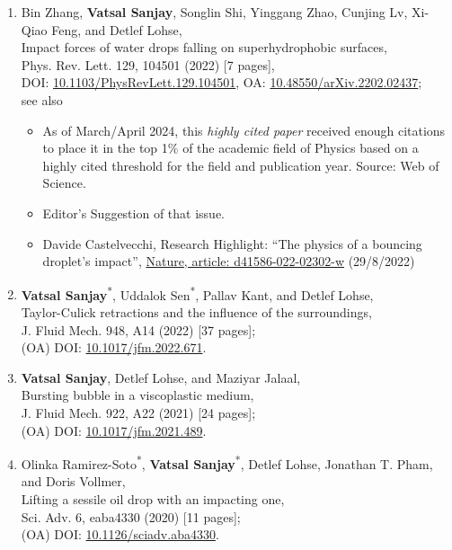 \documentclass[11pt,a4paper,roman,english,colorlinks,linkcolor={red!50!black}]{moderncv}
\newcommand{\equalcontrib}[1]{\textsuperscript{#1}}
\begin{document}
\begin{enumerate}[leftmargin=0.75cm]
	\item Bin Zhang, \textbf{Vatsal Sanjay}, Songlin Shi,  Yinggang Zhao,  Cunjing Lv,  Xi-Qiao Feng,  and Detlef Lohse,\\
	Impact forces of water drops falling on superhydrophobic surfaces,\\
	Phys. Rev. Lett. 129, 104501 (2022) [7 pages],\\
	DOI: \href{https://doi.org/10.1103/PhysRevLett.129.104501}{10.1103/PhysRevLett.129.104501}, OA:  \href{https://doi.org/10.48550/arXiv.2202.02437}{10.48550/arXiv.2202.02437};\\
	see also
	\begin{itemize}
		\item
		As of March/April 2024, this \textit{highly cited paper} received enough citations to place it in the top 1\% of the academic field of Physics based on a highly cited threshold for the field and publication year. Source: Web of Science.
		\item
		Editor's Suggestion of that issue.
		\item
		Davide Castelvecchi, Research Highlight: ``The physics of a bouncing droplet's impact'', \href{https://www.nature.com/articles/d41586-022-02302-w}{Nature, article: d41586-022-02302-w} (29/8/2022)
	\end{itemize}

	\item \textbf{Vatsal Sanjay}\equalcontrib{*}, Uddalok Sen\equalcontrib{*}, Pallav Kant, and Detlef Lohse,\\
	Taylor-Culick retractions and the influence of the surroundings,\\
	J. Fluid Mech. 948, A14  (2022) [37 pages];\\
	(OA) DOI: \href{https://doi.org/10.1017/jfm.2022.671}{10.1017/jfm.2022.671}.

	\item \textbf{Vatsal Sanjay}, Detlef Lohse, and Maziyar Jalaal,\\
	Bursting bubble in a viscoplastic medium,\\
	J. Fluid Mech. 922, A22  (2021) [24 pages];\\
	(OA) DOI: \href{https://doi.org/10.1017/jfm.2021.489}{10.1017/jfm.2021.489}.

	\item Olinka Ramirez-Soto\equalcontrib{*}, \textbf{Vatsal Sanjay}\equalcontrib{*},  Detlef Lohse,  Jonathan T. Pham, and Doris Vollmer,\\
	Lifting a sessile oil drop with an impacting one,\\
	Sci. Adv. 6, eaba4330  (2020) [11 pages];\\
	(OA) DOI: \href{https://doi.org/10.1126/sciadv.aba4330}{10.1126/sciadv.aba4330}.


\end{enumerate}
\end{document}
